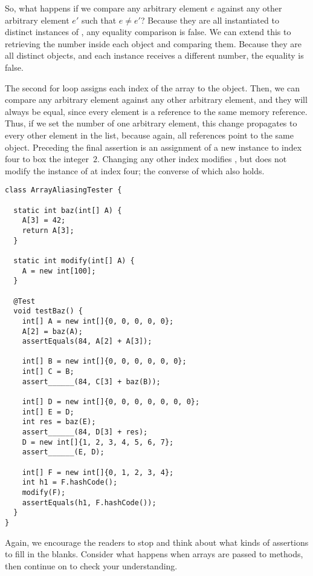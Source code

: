 So, what happens if we compare any arbitrary element $e$ against any other arbitrary element $e'$ such that $e \neq e'$? Because they are all instantiated to distinct instances of , any equality comparison is false. We can extend this to retrieving the number inside each  object and comparing them. Because they are all distinct objects, and each  instance receives a different number, the equality is false.

The second for loop assigns each index of the array to the  object. 
Then, we can compare any arbitrary element against any other arbitrary element, and they will always be equal, since every element is a reference to the same memory reference. 
Thus, if we set the number of one arbitrary element, this change propagates to every other element in the list, because again, all references point to the same object.
Preceding the final assertion is an assignment of a new  instance to index four to box the integer~$2$. 
Changing any other index modifies , but does not modify the instance of  at index four; the converse of which also holds.


\begin{lstlisting}[language=MyJava]
class ArrayAliasingTester {

  static int baz(int[] A) {
    A[3] = 42;
    return A[3];
  }

  static int modify(int[] A) {
    A = new int[100];
  }

  @Test
  void testBaz() {
    int[] A = new int[]{0, 0, 0, 0, 0};
    A[2] = baz(A);
    assertEquals(84, A[2] + A[3]);

    int[] B = new int[]{0, 0, 0, 0, 0, 0};
    int[] C = B;
    assert______(84, C[3] + baz(B));

    int[] D = new int[]{0, 0, 0, 0, 0, 0, 0};
    int[] E = D;
    int res = baz(E);
    assert______(84, D[3] + res);  
    D = new int[]{1, 2, 3, 4, 5, 6, 7};
    assert______(E, D);  

    int[] F = new int[]{0, 1, 2, 3, 4};
    int h1 = F.hashCode();
    modify(F);
    assertEquals(h1, F.hashCode());
  }
}
\end{lstlisting}

Again, we encourage the readers to stop and think about what kinds of assertions to fill in the blanks. Consider what happens when arrays are passed to methods, then continue on to check your understanding.

